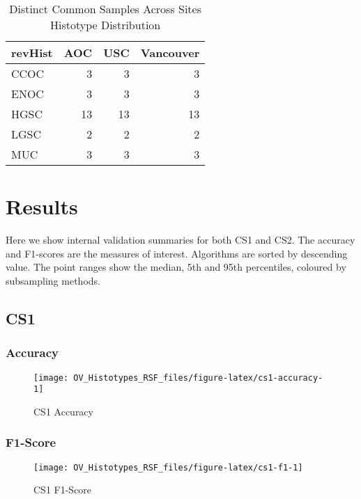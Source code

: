 \documentclass[
]{report}
\begin{document}
\begin{table}

\caption{\label{tab:common-dist-sites-distinct}Distinct Common Samples Across Sites Histotype Distribution}
\centering
\begin{tabular}[t]{l|r|r|r}
\hline
revHist & AOC & USC & Vancouver\\
\hline
CCOC & 3 & 3 & 3\\
\hline
ENOC & 3 & 3 & 3\\
\hline
HGSC & 13 & 13 & 13\\
\hline
LGSC & 2 & 2 & 2\\
\hline
MUC & 3 & 3 & 3\\
\hline
\end{tabular}
\end{table}

\hypertarget{results}{%
\chapter{Results}\label{results}}

Here we show internal validation summaries for both CS1 and CS2. The accuracy and F1-scores are the measures of interest. Algorithms are sorted by descending value. The point ranges show the median, 5th and 95th percentiles, coloured by subsampling methods.

\hypertarget{cs1}{%
\section{CS1}\label{cs1}}

\hypertarget{accuracy}{%
\subsection{Accuracy}\label{accuracy}}

\begin{figure}[H]

{\centering \texttt{[image: OV\_Histotypes\_RSF\_files/figure-latex/cs1-accuracy-1]} 

}

\caption{CS1 Accuracy}\label{fig:cs1-accuracy}
\end{figure}

\hypertarget{f1-score}{%
\subsection{F1-Score}\label{f1-score}}

\begin{figure}[H]

{\centering \texttt{[image: OV\_Histotypes\_RSF\_files/figure-latex/cs1-f1-1]} 

}

\caption{CS1 F1-Score}\label{fig:cs1-f1}
\end{figure}
\end{document}
